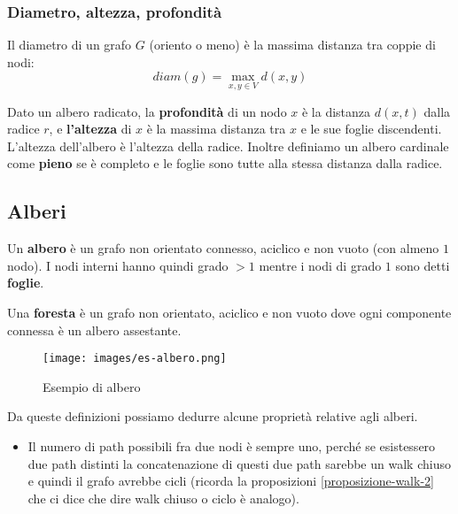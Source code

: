 \subsubsection{Diametro, altezza, profondità}
\begin{definition}
    Il diametro di un grafo $G$ (oriento o meno) è la massima distanza tra coppie di nodi:
    \[diam(g) = \max_{x,y \in V}d(x,y)\]
\end{definition}

\begin{definition}
    Dato un albero radicato, la \textbf{profondità} di un nodo $x$ è la distanza $d(x,t)$ dalla radice $r$, e \textbf{l'altezza} di $x$ è la massima distanza tra $x$ e le sue foglie discendenti. L'altezza dell'albero è l'altezza della radice. Inoltre definiamo un albero cardinale come \textbf{pieno} se è completo e le foglie sono tutte alla stessa distanza dalla radice.
\end{definition}



\newpage
\subsection{Alberi}
\begin{definition}
    Un \textbf{albero} è un grafo non orientato connesso, aciclico e non vuoto (con almeno $1$ nodo).
    I nodi interni hanno quindi grado $>1$ mentre i nodi di grado $1$ sono detti \textbf{foglie}.
\end{definition}

\begin{definition}[Foresta]
    Una \textbf{foresta} è un grafo non orientato, aciclico e non vuoto dove ogni componente connessa è un albero assestante.
\end{definition}

\begin{wrapfigure}[7]{r}{7cm}
    \vspace{-23pt}
    \centering
    \texttt{[image: images/es-albero.png]}
    \vspace{-5pt}
    \caption{Esempio di albero}
\end{wrapfigure}
\hspace{-15pt}Da queste definizioni possiamo dedurre alcune proprietà relative agli alberi.
\begin{itemize}
    \item Il numero di path possibili fra due nodi è sempre uno, perché se esistessero due path distinti la concatenazione di questi due path sarebbe un walk chiuso e quindi il grafo avrebbe cicli (ricorda la proposizioni \ref{proposizione-walk-2} che ci dice che dire walk chiuso o ciclo è analogo).
\end{itemize}


